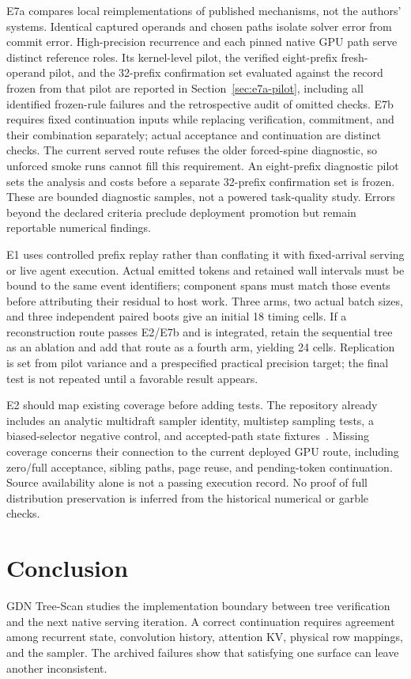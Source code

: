 \documentclass[conference]{IEEEtran}
\newcommand{\sys}{GDN Tree-Scan}
\begin{document}
E7a compares local reimplementations of published mechanisms, not the authors' systems. Identical captured operands and chosen paths isolate solver error from commit error. High-precision recurrence and each pinned native GPU path serve distinct reference roles. Its kernel-level pilot, the verified eight-prefix fresh-operand pilot, and the 32-prefix confirmation set evaluated against the record frozen from that pilot are reported in Section~\ref{sec:e7a-pilot}, including all identified frozen-rule failures and the retrospective audit of omitted checks. E7b requires fixed continuation inputs while replacing verification, commitment, and their combination separately; actual acceptance and continuation are distinct checks. The current served route refuses the older forced-spine diagnostic, so unforced smoke runs cannot fill this requirement. An eight-prefix diagnostic pilot sets the analysis and costs before a separate 32-prefix confirmation set is frozen. These are bounded diagnostic samples, not a powered task-quality study. Errors beyond the declared criteria preclude deployment promotion but remain reportable numerical findings.

E1 uses controlled prefix replay rather than conflating it with fixed-arrival serving or live agent execution. Actual emitted tokens and retained wall intervals must be bound to the same event identifiers; component spans must match those events before attributing their residual to host work. Three arms, two actual batch sizes, and three independent paired boots give an initial 18 timing cells. If a reconstruction route passes E2/E7b and is integrated, retain the sequential tree as an ablation and add that route as a fourth arm, yielding 24 cells. Replication is set from pilot variance and a prespecified practical precision target; the final test is not repeated until a favorable result appears.

E2 should map existing coverage before adding tests. The repository already includes an analytic multidraft sampler identity, multistep sampling tests, a biased-selector negative control, and accepted-path state fixtures~\cite{lumo2026archive}. Missing coverage concerns their connection to the current deployed GPU route, including zero/full acceptance, sibling paths, page reuse, and pending-token continuation. Source availability alone is not a passing execution record. No proof of full distribution preservation is inferred from the historical numerical or garble checks.

\section{Conclusion}
\sys{} studies the implementation boundary between tree verification and the next native serving iteration. A correct continuation requires agreement among recurrent state, convolution history, attention KV, physical row mappings, and the sampler. The archived failures show that satisfying one surface can leave another inconsistent.
\end{document}
